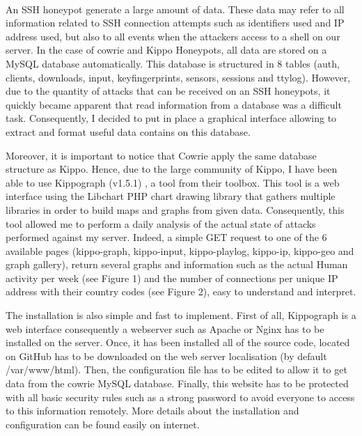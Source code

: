 \paragraph{}

An SSH honeypot generate a large amount of data. These data may refer to all information
related to SSH connection attempts such as identifiers used and IP address used, but also
to all events when the attackers access to a shell on our server.
In the case of cowrie and Kippo Honeypots, all data are stored on a MySQL database automatically.
This database is structured in 8 tables (auth, clients, downloads, input, keyfingerprints,
sensors, sessions and ttylog). However, due to the quantity of attacks that can be received
on an SSH honeypots, it quickly became apparent that read information from a database was a 
difficult task.
Consequently, I decided to put in place a graphical interface allowing to extract and format
useful data contains on this database.

Moreover, it is important to notice that Cowrie apply the same database structure as Kippo.
Hence, due to the large community of Kippo, I have been able to use Kippograph (v1.5.1) \cite{kippograph}, a
tool from their toolbox.
This tool is a web interface using the Libchart PHP chart drawing library that gathers multiple
libraries in order to build maps and graphs from given data. Consequently, this tool allowed me
to perform a daily analysis of the actual state of attacks performed against my server.
Indeed, a simple GET request to one of the 6 available pages (kippo-graph, kippo-input,
kippo-playlog, kippo-ip, kippo-geo and graph gallery), return several graphs and information
such as the actual Human activity per week (see Figure 1) and the number of 
connections per unique IP address with their country codes (see Figure 2), easy to
understand and interpret.


The installation is also simple and fast to implement. First of all, Kippograph is a web interface
consequently a webserver such as Apache \cite{apache} or Nginx \cite{nginx} has to be installed on the server. Once, it
has been installed all of the source code, located on GitHub has to be downloaded on the web server
localisation (by default /var/www/html). Then, the configuration file has to be edited to 
allow it to get data from the cowrie MySQL database.
Finally, this website has to be protected with all basic security rules such as a strong
password to avoid everyone to access to this information remotely. More details about
the installation and configuration can be found easily on internet.



